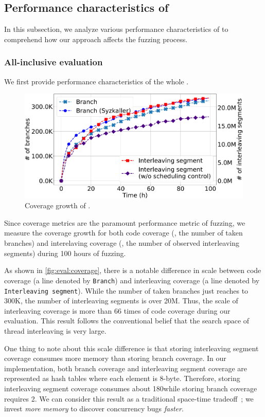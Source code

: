\subsection{Performance characteristics of \sys}
\label{ss:characteristics}

In this subsection, we analyze various performance characteristics of
\sys to comprehend how our approach affects the fuzzing process.
%
\subsubsection{All-inclusive evaluation}
\label{sss:allinclusive}

We first provide performance characteristics of the whole \sys.


%
\begin{figure}[t]
  \centering
  \includegraphics[width=0.9\linewidth]{fig/coverage_graph-crop.pdf}
  \caption{Coverage growth of \sys.}
  \label{fig:eval:coverage}
\end{figure}
%
Since coverage metrics are the paramount performance metric of
fuzzing, we measure the coverage growth for both code coverage (\ie,
the number of taken branches) and interelaving coverage (\ie, the
number of observed interleaving segments) during 100 hours of fuzzing.

As shown in \autoref{fig:eval:coverage}, there is a notable difference
in scale between code coverage (a line denoted by \texttt{Branch}) and
interleaving coverage (a line denoted by \texttt{Interleaving segment}).
%
While the number of taken branches just reaches to 300K, the number of
interleaving segments is over 20M. Thus, the scale of interleaving
coverage is more than 66 times of code coverage during our evaluation.
%
This result follows the conventional belief that the search space of
thread interleaving is very large.

One thing to note about this scale difference is that storing
interleaving segment coverage consumes more memory than storing branch
coverage.
%
In our implementation, both branch coverage and interleaving segment
coverage are represented as hash tables where each element is
8-byte. Therefore, storing interleaving segment coverage consumes
about 180\MB while storing branch coverage requires 2\MB.
%
We can consider this result as a traditional space-time
tradeoff~\cite{spacetimetradeoff}; we invest \textit{more memory} to
discover concurrency bugs \textit{faster}.
%


